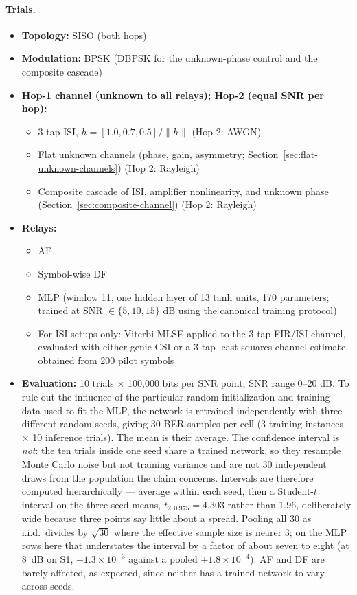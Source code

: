 \paragraph{\textbf{Trials.}} 
\begin{itemize} 
 \item \textbf{Topology:} SISO (both hops) 
    \item \textbf{Modulation:} BPSK (DBPSK for the unknown-phase control and the composite cascade)
    \item \textbf{Hop-1 channel (unknown to all relays); Hop-2 (equal SNR per hop):}
    \begin{itemize}
        \item 3-tap ISI, $h=[1.0,0.7,0.5]/\lVert h\rVert$ (Hop 2: AWGN)
        \item Flat unknown channels (phase, gain, asymmetry; Section~\ref{sec:flat-unknown-channels}) (Hop 2: Rayleigh)
        \item Composite cascade of ISI, amplifier nonlinearity, and unknown phase (Section~\ref{sec:composite-channel}) (Hop 2: Rayleigh)
    \end{itemize}
    \item \textbf{Relays:}
    \begin{itemize} 
        \item AF 
        \item Symbol-wise DF 
        \item MLP (window 11, one hidden layer of 13 tanh units, 170 parameters; trained at SNR $\in\{5,10,15\}$ dB using the canonical training protocol) 
        \item For ISI setups only: Viterbi MLSE applied to the 3-tap FIR/ISI channel, evaluated with either genie CSI or a 3-tap least-squares channel estimate obtained from 200 pilot symbols 
    \end{itemize} 
\item \textbf{Evaluation:} 10 trials $\times$ 100{,}000 bits per SNR point, SNR range 0--20 dB. To rule out the influence of the particular random initialization and training data used to fit the MLP, the network is retrained independently with three different random seeds, giving 30 BER samples per cell (3 training instances $\times$ 10 inference trials). The mean is their average. The confidence interval is \emph{not}: the ten trials inside one seed share a trained network, so they resample Monte Carlo noise but not training variance and are not 30 independent draws from the population the claim concerns. Intervals are therefore computed hierarchically --- average within each seed, then a Student-$t$ interval on the three seed means, $t_{2,0.975} = 4.303$ rather than $1.96$, deliberately wide because three points say little about a spread. Pooling all 30 as i.i.d.\ divides by $\sqrt{30}$ where the effective sample size is nearer 3; on the MLP rows here that understates the interval by a factor of about seven to eight (at 8~dB on S1, ${\pm}1.3\times10^{-3}$ against a pooled ${\pm}1.8\times10^{-4}$). AF and DF are barely affected, as expected, since neither has a trained network to vary across seeds.
\end{itemize}

